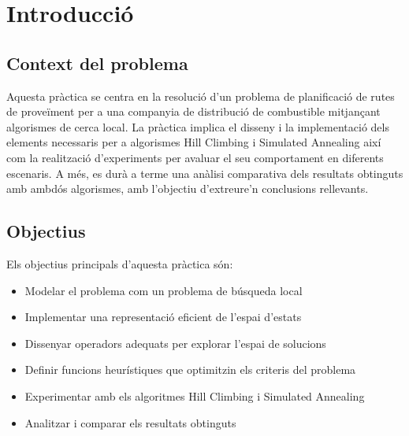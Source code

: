 \section{Introducció}
\label{sec:introduction}

\subsection{Context del problema }
Aquesta pràctica se centra en la resolució d'un problema de planificació de rutes de proveïment per a una companyia de distribució de combustible mitjançant algorismes de cerca local. La pràctica implica el disseny i la implementació dels elements necessaris per a algorismes Hill Climbing i Simulated Annealing així com la realització d’experiments per avaluar el seu comportament en diferents escenaris. A més, es durà a terme una anàlisi comparativa dels resultats obtinguts amb ambdós algorismes, amb l’objectiu d’extreure’n conclusions rellevants.

\subsection{Objectius}
Els objectius principals d'aquesta pràctica són:

\begin{itemize}
    \item Modelar el problema com un problema de búsqueda local
    \item Implementar una representació eficient de l'espai d'estats
    \item Dissenyar operadors adequats per explorar l'espai de solucions
    \item Definir funcions heurístiques que optimitzin els criteris del problema
    \item Experimentar amb els algoritmes Hill Climbing i Simulated Annealing
    \item Analitzar i comparar els resultats obtinguts
\end{itemize}
